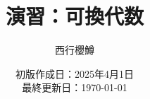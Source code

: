 \newcommand{\CATEGORY}{演習}%
\newcommand{\TITLE}{可換代数}
\newcommand{\AUTHORNAME}{西行櫻鱒}
\newcommand{\CREATEDAT}{2025年4月1日}

\title{\CATEGORY：\TITLE}
\author{\AUTHORNAME}
\date{初版作成日：\CREATEDAT\\最終更新日：\today\\}

